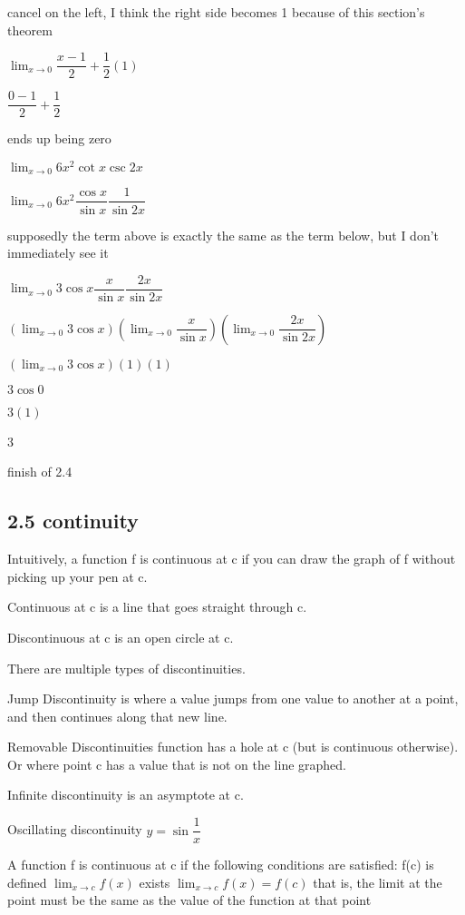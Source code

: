 \documentclass[12pt]{article}
\begin{document}
cancel on the left, I think the right side becomes 1 because of this section's theorem

$\lim_{x \to 0}\dfrac{x - 1}{2} +\dfrac{1}{2} (1)$

$\dfrac{0-1}{2} + \dfrac{1}{2}$

ends up being zero

$\lim_{x \to 0} 6x^2 \cot x \csc 2x$

$\lim_{x \to 0} 6x^2 \dfrac{\cos x}{\sin x} \dfrac{1}{\sin 2x}$

supposedly the term above is exactly the same as the term below, but I don't immediately see it

$\lim_{x \to 0} 3\cos x \dfrac{x}{\sin x} \dfrac{2x}{\sin 2x}$

$(\lim_{x \to 0} 3\cos x)(\lim_{x \to 0} \dfrac{x}{\sin x})(\lim_{x \to 0} \dfrac{2x}{\sin 2x})$

$(\lim_{x \to 0} 3\cos x)(1)(1)$

$3 \cos 0$

$3(1)$

3

finish of 2.4

\subsection{2.5 continuity}

Intuitively, a function f is continuous at c if you can draw the graph of f without picking up your pen at c.

Continuous at c is a line that goes straight through c.

Discontinuous at c is an open circle at c.

There are multiple types of discontinuities.

Jump Discontinuity is where a value jumps from one value to another at a point, and then continues along that
new line.

Removable Discontinuities function has a hole at c (but is continuous otherwise).
Or where point c has a value that is not on the line graphed.

Infinite discontinuity is an asymptote at c.

Oscillating discontinuity $y = \sin\dfrac{1}{x}$

A function f is continuous at c if the following conditions are satisfied:
f(c) is defined
$\lim_{x \to c}f(x)$ exists
$\lim_{x \to c}f(x) = f(c)$ that is, the limit at the point must be the same as the value of the function at
that point
\end{document}
